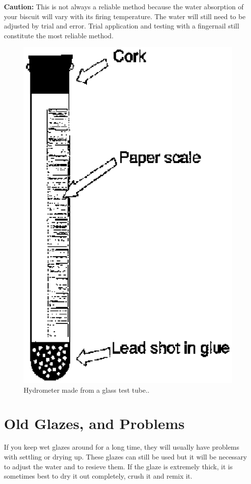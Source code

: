 \textbf{Caution:} This is not always a reliable method because the water 
absorption of your biscuit will vary with its firing temperature. The water 
will still need to be adjusted by trial and error. Trial application and 
testing with a fingernail still constitute the most reliable method.
\begin{figure}[htbp!]
  \centering
  \includegraphics[width=0.8\linewidth]{img/Hydrometer.eps}
  \caption{Hydrometer made from a glass test tube..}
  \label{fig:Hydrometer}
\end{figure}
\section{Old Glazes, and Problems}
If you keep wet glazes around for a long time, they will usually have problems 
with settling or drying up. These glazes can still be used but it will be 
necessary to adjust the water and to resieve them. If the glaze is extremely 
thick, it is sometimes best to dry it out completely, crush it and remix it.

